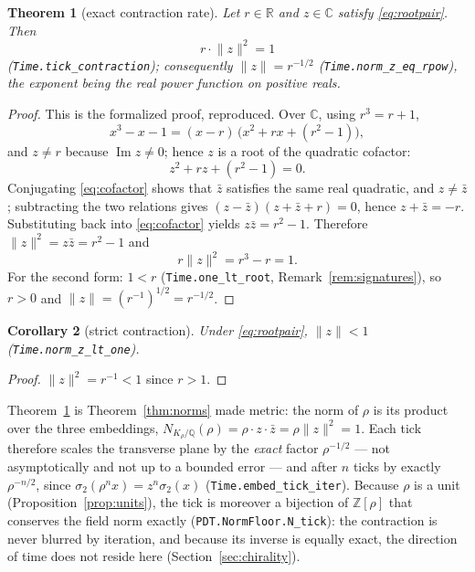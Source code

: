 \documentclass[11pt]{amsart}
\theoremstyle{plain}
\newtheorem{theorem}{Theorem}[section]
\newtheorem{corollary}[theorem]{Corollary}
\theoremstyle{definition}
\theoremstyle{remark}
\begin{document}
\begin{theorem}[exact contraction rate]\label{thm:contraction}
Let $r \in \mathbb{R}$ and $z \in \mathbb{C}$ satisfy \eqref{eq:rootpair}. Then
\[
  r \cdot \lVert z \rVert^2 = 1
\]
\textup{(\texttt{Time.tick\_contraction})}; consequently $\lVert z \rVert = r^{-1/2}$ \textup{(\texttt{Time.norm\_z\_eq\_rpow})}, the exponent being the real power function on positive reals.
\end{theorem}

\begin{proof}
This is the formalized proof, reproduced. Over $\mathbb{C}$, using $r^3 = r + 1$,
\[
  x^3 - x - 1 = (x - r)\,\bigl(x^2 + rx + (r^2 - 1)\bigr),
\]
and $z \ne r$ because $\operatorname{Im} z \ne 0$; hence $z$ is a root of the quadratic cofactor:
\begin{equation}\label{eq:cofactor}
  z^2 + rz + (r^2 - 1) = 0 .
\end{equation}
Conjugating \eqref{eq:cofactor} shows that $\bar z$ satisfies the same real quadratic, and $z \ne \bar z$; subtracting the two relations gives $(z - \bar z)(z + \bar z + r) = 0$, hence $z + \bar z = -r$. Substituting back into \eqref{eq:cofactor} yields $z \bar z = r^2 - 1$. Therefore $\lVert z \rVert^2 = z\bar z = r^2 - 1$ and
\[
  r \lVert z \rVert^2 = r^3 - r = 1 .
\]
For the second form: $1 < r$ \textup{(\texttt{Time.one\_lt\_root}}, Remark~\ref{rem:signatures}\textup{)}, so $r > 0$ and $\lVert z \rVert = (r^{-1})^{1/2} = r^{-1/2}$.
\end{proof}

\begin{corollary}[strict contraction]\label{cor:strict}
Under \eqref{eq:rootpair}, $\lVert z \rVert < 1$ \textup{(\texttt{Time.norm\_z\_lt\_one})}.
\end{corollary}

\begin{proof}
$\lVert z \rVert^2 = r^{-1} < 1$ since $r > 1$.
\end{proof}

Theorem~\ref{thm:contraction} is Theorem~\ref{thm:norms} made metric: the norm of $\rho$ is its product over the three embeddings, $N_{K_{\rho}/\mathbb{Q}}(\rho) = \rho \cdot z \cdot \bar z = \rho \lVert z \rVert^2 = 1$. Each tick therefore scales the transverse plane by the \emph{exact} factor $\rho^{-1/2}$ --- not asymptotically and not up to a bounded error --- and after $n$ ticks by exactly $\rho^{-n/2}$, since $\sigma_2(\rho^n x) = z^n \sigma_2(x)$ \textup{(\texttt{Time.embed\_tick\_iter})}. Because $\rho$ is a unit (Proposition~\ref{prop:units}), the tick is moreover a bijection of $\mathbb{Z}[\rho]$ that conserves the field norm exactly (\texttt{PDT.NormFloor.N\_tick}): the contraction is never blurred by iteration, and because its inverse is equally exact, the direction of time does not reside here (Section~\ref{sec:chirality}).
\end{document}

